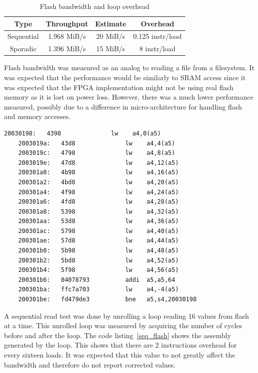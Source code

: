 \documentclass{article}
\begin{document}
\begin{table}[h!]
\centering
\begin{tabular}{|c||c|c|c|} 
 \hline
 Type & Throughput & Estimate & Overhead \\ [0.5ex]
 \hline\hline
 Sequential & 1.968 MiB/s & 20 MiB/s & 0.125 instr/load \\
 \hline
 Sporadic & 1.396 MiB/s & 15 MiB/s & 8 instr/load \\ [1ex] 
 \hline
\end{tabular}
\caption{Flash bandwidth and loop overhead}
\label{table:flash-bandwidth}
\end{table}

Flash bandwidth was measured as an analog to reading a file from a filesystem. It was expected that the performance would be similarly to SRAM access since it was expected that the FPGA implementation might not be using real flash memory as it is lost on power loss. However, there was a much lower performance measured, possibly due to a difference in micro-architecture for handling flash and memory accesses.

\begin{lstlisting}[caption={Sequential flash copy disassembly}, label={seq_flash}]
    20030198:	4398              lw	a4,0(a5)
    2003019a:	43d8              lw	a4,4(a5)
    2003019c:	4798              lw	a4,8(a5)
    2003019e:	47d8              lw	a4,12(a5)
    200301a0:	4b98              lw	a4,16(a5)
    200301a2:	4bd8              lw	a4,20(a5)
    200301a4:	4f98              lw	a4,24(a5)
    200301a6:	4fd8              lw	a4,28(a5)
    200301a8:	5398              lw	a4,32(a5)
    200301aa:	53d8              lw	a4,36(a5)
    200301ac:	5798              lw	a4,40(a5)
    200301ae:	57d8              lw	a4,44(a5)
    200301b0:	5b98              lw	a4,48(a5)
    200301b2:	5bd8              lw	a4,52(a5)
    200301b4:	5f98              lw	a4,56(a5)
    200301b6:	04078793          addi	a5,a5,64
    200301ba:	ffc7a703          lw	a4,-4(a5)
    200301be:	fd479de3          bne	a5,s4,20030198
\end{lstlisting}

A sequential read test was done by unrolling a loop reading 16 values from flash at a time. This unrolled loop was measured by acquiring the number of cycles before and after the loop. The code listing~\ref{seq_flash} shows the assembly generated by the loop. This shows that there are 2 instructions overhead for every sixteen loads. It was expected that this value to not greatly affect the bandwidth and therefore do not report corrected values.
\end{document}
